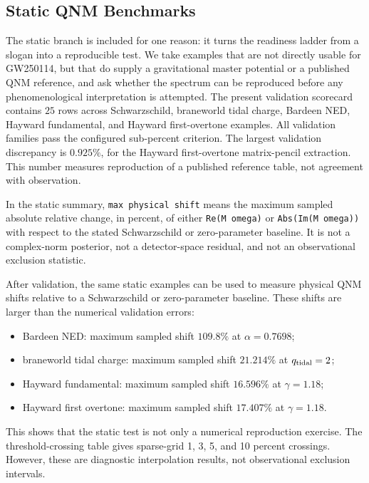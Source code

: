 \documentclass[aps,prd,10pt,twocolumn,nofootinbib,superscriptaddress]{revtex4-2}
\begin{document}
\subsection{Static QNM Benchmarks}

The static branch is included for one reason: it turns the readiness ladder
from a slogan into a reproducible test. We take examples that are not directly
usable for GW250114, but that do supply a gravitational master potential or a
published QNM reference, and ask whether the spectrum can be reproduced before
any phenomenological interpretation is attempted. The present validation
scorecard contains $25$ rows across Schwarzschild, braneworld tidal charge,
Bardeen NED, Hayward fundamental, and Hayward first-overtone examples. All
validation families pass the configured sub-percent criterion. The largest
validation discrepancy is $0.925\%$, for the Hayward first-overtone
matrix-pencil extraction. This number measures reproduction of a published
reference table, not agreement with observation.

In the static summary, \texttt{max physical shift} means the maximum sampled absolute
relative change, in percent, of either \texttt{Re(M omega)} or \texttt{Abs(Im(M omega))}
with respect to the stated Schwarzschild or zero-parameter baseline. It is not
a complex-norm posterior, not a detector-space residual, and not an
observational exclusion statistic.

After validation, the same static examples can be used to measure physical QNM
shifts relative to a Schwarzschild or zero-parameter baseline. These shifts are
larger than the numerical validation errors:

\begin{itemize}
\item Bardeen NED: maximum sampled shift $109.8\%$ at $\alpha=0.7698$;
\item braneworld tidal charge: maximum sampled shift $21.214\%$ at $q_{\rm tidal}=2$;
\item Hayward fundamental: maximum sampled shift $16.596\%$ at $\gamma=1.18$;
\item Hayward first overtone: maximum sampled shift $17.407\%$ at $\gamma=1.18$.
\end{itemize}

This shows that the static test is not only a numerical reproduction exercise.
The threshold-crossing table gives sparse-grid 1, 3, 5, and 10 percent
crossings. However, these are diagnostic interpolation results, not
observational exclusion intervals.
\end{document}
